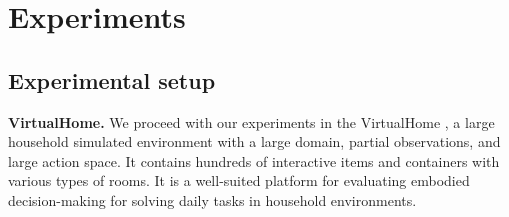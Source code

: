 \section{Experiments}\label{sec:main_experiments}

\subsection{Experimental setup}

\textbf{VirtualHome.}
We proceed with our experiments in the VirtualHome \cite{puig2018virtualhome}, a large household simulated environment with a large domain, partial observations, and large action space. It contains hundreds of interactive items and containers with various types of rooms. It is a well-suited platform for evaluating embodied decision-making for solving daily tasks in household environments.




